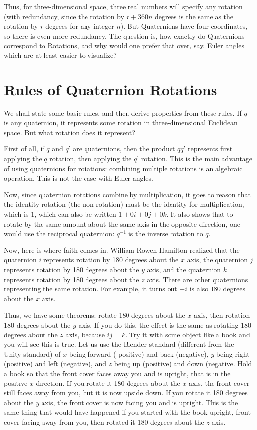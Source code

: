 \documentclass[letter,12pt]{article}
\begin{document}
Thus, for three-dimensional space, three real numbers will specify any rotation (with redundancy, since the rotation by $r+360n$ degrees is the same as the rotation by $r$ degrees for any integer $n$).  But Quaternions have four coordinates, so there is even more redundancy.  The question is, how exactly do Quaternions correspond to Rotations, and why would one prefer that over, say, Euler angles which are at least easier to visualize?

\section{Rules of Quaternion Rotations}
We shall state some basic rules, and then derive properties from these rules.  If $q$ is any quaternion, it represents some rotation in three-dimensional Euclidean space.  But what rotation does it represent?

First of all, if $q$ and $q’$ are quaternions, then the product $qq’$ represents first applying the $q$ rotation, then applying the $q’$ rotation.  This is the main advantage of using quaternions for rotations: combining multiple rotations is an algebraic operation.  This is not the case with Euler angles.

Now, since quaternion rotations combine by multiplication, it goes to reason that the identity rotation (the non-rotation) must be the identity for multiplication, which is $1$, which can also be written $1+0i+0j+0k$.  It also shows that to rotate by the same amount about the same axis in the opposite direction, one would use the reciprocal quaternion: $q^{-1}$ is the inverse rotation to $q$.  

Now, here is where faith comes in.  William Rowen Hamilton realized that the quaternion $i$ represents rotation by 180 degrees about the $x$ axis, the quaternion $j$ represents rotation by 180 degrees about the $y$ axis, and the quaternion $k$ represents rotation by 180 degrees about the $z$ axis.  There are other quaternions representing the same rotation.  For example, it turns out $-i$ is also 180 degrees about the $x$ axis.  

Thus, we have some theorems: rotate 180 degrees about the $x$ axis, then rotation 180 degrees about the $y$ axis.  If you do this, the effect is the same as rotating 180 degrees about the $z$ axis, because $ij=k$.    Try it with some object like a book and you will see this is true.  Let us use the Blender standard (different from the Unity standard) of $x$ being forward ( positive) and back (negative), $y$ being right (positive) and left (negative), and $z$ being up (positive) and down (negative.  Hold a book so that the front cover faces away you and is upright, that is in the positive $x$ direction.  If you rotate it 180 degrees about the $x$ axis, the front cover still faces away from you, but it is now upside down.  If you rotate it 180 degrees about the $y$ axis, the front cover is now facing you and is upright.  This is the same thing that would have happened if you started with the book upright, front cover facing away from you, then rotated it 180 degrees about the $z$ axis.
\end{document}
